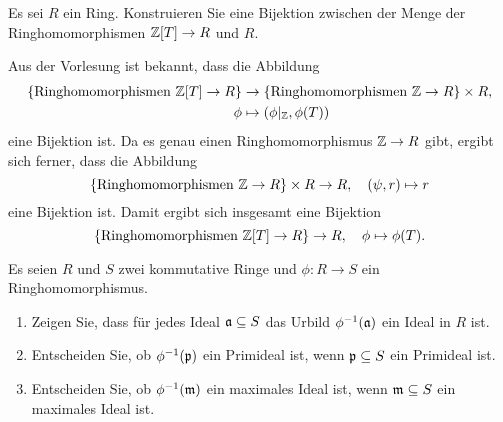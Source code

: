 \begin{question}
  Es sei $R$ ein Ring.
  Konstruieren Sie eine Bijektion zwischen der Menge der Ringhomomorphismen $\mathbb{Z}[T] \to R$ und $R$.
\end{question}


\begin{solution}
  Aus der Vorlesung ist bekannt, dass die Abbildung
  \begin{align*}
              \{ \text{Ringhomomorphismen $\mathbb{Z}[T] \to R$} \}
    &\to      \{ \text{Ringhomomorphismen $\mathbb{Z} \to R$} \} \times R,
    \\
              \phi
    &\mapsto  (\phi|_{\mathbb{Z}}, \phi(T))
  \end{align*}
  eine Bijektion ist.
  Da es genau einen Ringhomomorphismus $\mathbb{Z} \to R$ gibt, ergibt sich ferner, dass die Abbildung
  \[
            \{ \text{Ringhomomorphismen $\mathbb{Z} \to R$} \} \times R
    \to     R,
    \quad
            (\psi, r)
    \mapsto r
  \]
  eine Bijektion ist.
  Damit ergibt sich insgesamt eine Bijektion
  \[
            \{ \text{Ringhomomorphismen $\mathbb{Z}[T] \to R$} \}
    \to     R,
    \quad
            \phi
    \mapsto \phi(T).
  \]
\end{solution}


\begin{question}[subtitle = Urbilder von Idealen]
  \label{question: preimages of ideals}
  Es seien $R$ und $S$ zwei kommutative Ringe und $\phi \colon R \to S$ ein Ringhomomorphismus.
  \begin{enumerate}
    \item
      Zeigen Sie, dass für jedes Ideal $\mathfrak{a} \subseteq S$ das Urbild $\phi^{-1}(\mathfrak{a})$ ein Ideal in $R$ ist.
    \item
      Entscheiden Sie, ob $\phi^{-1}(\mathfrak{p})$ ein Primideal ist, wenn $\mathfrak{p} \subseteq S$ ein Primideal ist.
    \item
      Entscheiden Sie, ob $\phi^{-1}(\mathfrak{m})$ ein maximales Ideal ist, wenn $\mathfrak{m} \subseteq S$ ein maximales Ideal ist.
  \end{enumerate}
\end{question}


